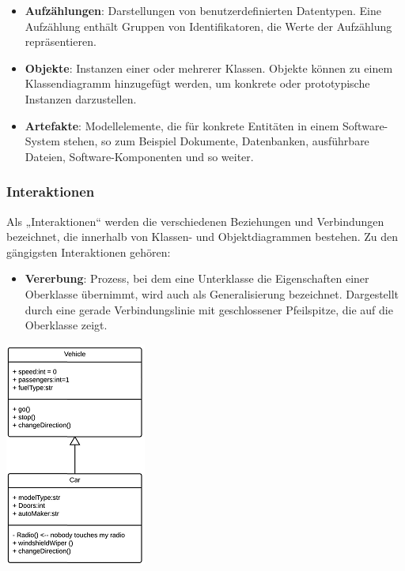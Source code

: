 \begin{itemize}
	\item \textbf{Aufzählungen}: Darstellungen von benutzerdefinierten Datentypen. Eine Aufzählung enthält Gruppen von Identifikatoren, die Werte der Aufzählung repräsentieren.
	
	\item \textbf{Objekte}: Instanzen einer oder mehrerer Klassen. Objekte können zu einem Klassendiagramm hinzugefügt werden, um konkrete oder prototypische Instanzen darzustellen.
	
	\item \textbf{Artefakte}: Modellelemente, die für konkrete Entitäten in einem Software-System stehen, so zum Beispiel Dokumente, Datenbanken, ausführbare Dateien, Software-Komponenten und so weiter.
\end{itemize}

\subsubsection{Interaktionen}
Als „Interaktionen“ werden die verschiedenen Beziehungen und Verbindungen bezeichnet, die innerhalb von Klassen- und Objektdiagrammen bestehen. Zu den gängigsten Interaktionen gehören:


\begin{minipage}[c]{0.65\textwidth}
	\begin{itemize}
		\item \textbf{Vererbung}: Prozess, bei dem eine Unterklasse die Eigenschaften einer Oberklasse übernimmt, wird auch als Generalisierung bezeichnet. Dargestellt durch eine gerade Verbindungslinie mit geschlossener Pfeilspitze, die auf die Oberklasse zeigt.
	\end{itemize}
\end{minipage}
\hfill
\begin{minipage}[c]{0.25\textwidth}
	\includegraphics[scale=.7]{Bilder/Klassendiagramm/InteraktionVererbung.png}
\end{minipage}

